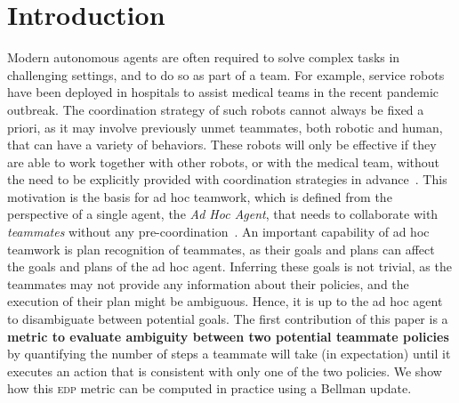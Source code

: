 \documentclass[letterpaper]{article}
\begin{document}
\section{Introduction}
Modern autonomous agents are often required to solve complex tasks in challenging settings, and to do so as part of a team. For example, service robots have been deployed in hospitals to assist medical teams in the recent pandemic outbreak. The coordination strategy of such robots cannot always be fixed a priori, as it may involve previously unmet teammates, both robotic and human, that can have a variety of behaviors. %
These robots will only be effective if they are able to work together with other robots, or with the medical team, without the need to be explicitly provided with coordination strategies in advance~\cite{cakmak2012designing}.
This motivation is the basis for ad hoc teamwork, which is defined from the perspective of a single agent, the \emph{Ad Hoc Agent}, that needs to collaborate with \emph{teammates} without any pre-coordination~\cite{stone2010ad,albrecht2018autonomous}.
An important capability of ad hoc teamwork is plan recognition of teammates, as their goals and plans can affect the goals and plans of the ad hoc agent.
Inferring these goals is not trivial, as the teammates may not provide any information about their policies, and the execution of their plan might be ambiguous. Hence, it is up to the ad hoc agent to disambiguate between potential goals.
The first contribution of this paper is a \textbf{metric to evaluate ambiguity between two potential teammate policies} by quantifying the number of steps a teammate will take (in expectation) until it executes an action that is consistent with only one of the two policies. 
We show how this \textsc{edp} metric can be computed in practice using a Bellman update.
\end{document}
